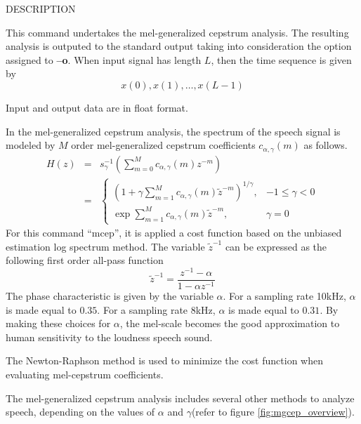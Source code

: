 \begin{qsection}{DESCRIPTION}

This command undertakes the mel-generalized cepstrum analysis.
The resulting analysis is outputed to the standard output
taking into consideration the option assigned to {\bf --o}.
When input signal has length $L$,
then the time sequence is given by
\begin{displaymath}
  x(0),x(1),\ldots,x(L-1)
\end{displaymath}
\par
Input and output data are in float format.
\par
In the mel-generalized cepstrum analysis, the spectrum of the speech signal
is modeled by $M$ order mel-generalized cepstrum
coefficients $c_{\alpha, \gamma}(m)$
as follows.
\begin{eqnarray*}
H(z) &=& s_\gamma^{-1}\left(
	\sum_{m=0}^M c_{\alpha, \gamma}(m)z^{-m} \right) \\
     &=& \left\{ \begin{array}{ll} \displaystyle
	\left( 1+\gamma\sum_{m=1}^M c_{\alpha, \gamma}(m)\tilde{z}^{-m}
		\right)^{1/\gamma}, & -1 \leq \gamma < 0 \\
	\displaystyle \exp \sum_{m=1}^M c_{\alpha, \gamma}(m)\tilde{z}^{-m}, 
		& \gamma=0
	\end{array} \right.
\end{eqnarray*}
For this command ``mcep'', it is applied a cost function
based on the unbiased estimation log spectrum method.
The variable $\tilde{z}^{-1}$ can be expressed as the following
first order all-pass function
\begin{displaymath}
\tilde{z}^{-1} = \frac{z^{-1}-\alpha}{1-\alpha z^{-1}}
\end{displaymath}
The phase characteristic is given by the variable $\alpha$.
For a sampling rate 10kHz, $\alpha$ is made equal to $0.35$.
For a sampling rate 8kHz, $\alpha$ is made equal to $0.31$.
By making these choices for $\alpha$,
the mel-scale becomes the good approximation to human
sensitivity to the loudness speech sound.
\par
The Newton-Raphson method is used to minimize the cost function
when evaluating mel-cepstrum coefficients.
\par
The mel-generalized cepstrum analysis includes several other
methods to analyze speech, depending on the values of $\alpha$
and $\gamma$(refer to figure \ref{fig:mgcep_overview}).


\end{qsection}
